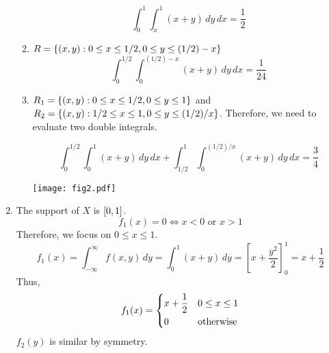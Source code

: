 \begin{Example}{}{}
\begin{enumerate}[label=(\roman*)]
\begin{enumerate}[label=(\alph*)]
\[                            \int_{0}^{1} \int_{x}^{1} (x+y)\, d{y} \, d{x}
                            =\frac{1}{2}
                        \]
                  \item $ R=\{(x,y):0\le x\le
                                1/2,0\le y\le (1/2)-x \} $
                        \[
                            \int_{0}^{1/2} \int_{0}^{(1/2)-x} (x+y)\, d{y} \, d{x}
                            =\frac{1}{24}
                        \]
                  \item $ R_1 = \{(x,y):0\le x\le 1/2,0\le y\le 1\} $ and
                        $ R_2 = \{(x,y):1/2 \le x\le 1, 0\le y\le (1/2)/x\} $.
                        Therefore, we need to evaluate two double integrals.

                        \begin{minipage}{0.6\textwidth}
                            \[ \int_{0}^{1/2} \int_{0}^{1} (x+y)\, d{y} \, d{x}
                                +\int_{1/2}^{1} \int_{0}^{(1/2)/x} (x+y)\, d{y} \, d{x}
                                =\frac{3}{4}
                            \]
                        \end{minipage}
                        \begin{minipage}{0.2\textwidth}
                            \texttt{[image: fig2.pdf]}
                        \end{minipage}
              \end{enumerate}
        \item The support of $ X $ is $ \interval{0}{1} $.
              \[ f_1(x)=0\iff x<0\text{ or } x>1 \]
              Therefore, we focus on $ 0\le x\le 1 $.
              \[ f_1(x)=\int_{-\infty}^{\infty} f(x,y)\, d{y}
                  =\int_{0}^{1} (x+y)\, d{y}=\left[ x+\frac{y^2}{2} \right]_0^1
                  =x+\frac{1}{2} \]
              Thus,
              \[ f_1(x)=
                  \begin{dcases}
                      x+\frac{1}{2} & 0\le x\le 1      \\
                      0             & \text{otherwise}
                  \end{dcases} \]
              $ f_2(y) $ is similar by symmetry.
    \end{enumerate}
\end{Example}
